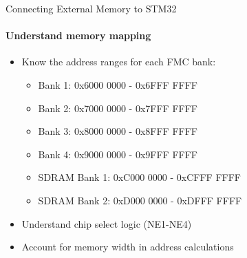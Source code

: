 \begin{KR}{Connecting External Memory to STM32}
\paragraph{Understand memory mapping}
\begin{itemize}
    \item Know the address ranges for each FMC bank:
    \begin{itemize}
        \item Bank 1: 0x6000 0000 - 0x6FFF FFFF
        \item Bank 2: 0x7000 0000 - 0x7FFF FFFF
        \item Bank 3: 0x8000 0000 - 0x8FFF FFFF
        \item Bank 4: 0x9000 0000 - 0x9FFF FFFF
        \item SDRAM Bank 1: 0xC000 0000 - 0xCFFF FFFF
        \item SDRAM Bank 2: 0xD000 0000 - 0xDFFF FFFF
    \end{itemize}
    \item Understand chip select logic (NE1-NE4)
    \item Account for memory width in address calculations
\end{itemize}
\end{KR}

